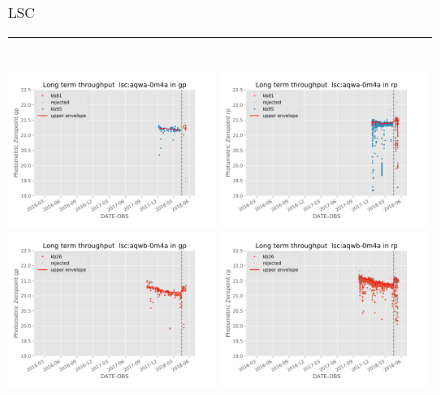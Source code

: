 \documentclass[]{spie}
\begin{document}
\begin{figure}
\centering 
LSC \\ 
\rule{\textwidth}{0.4pt} \\
\includegraphics[width=0.49\textwidth]{images/photzptrend-lsc-aqwa-0m4a-gp.png} \hspace*{\fill}
\includegraphics[width=0.49\textwidth]{images/photzptrend-lsc-aqwa-0m4a-rp.png} \\
\includegraphics[width=0.49\textwidth]{images/photzptrend-lsc-aqwb-0m4a-gp.png} \hspace*{\fill}
\includegraphics[width=0.49\textwidth]{images/photzptrend-lsc-aqwb-0m4a-rp.png} \\

\end{figure}
\end{document}
